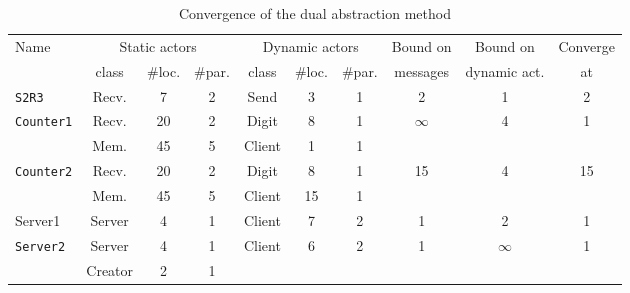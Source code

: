 \documentclass[a4paper]{report}
\numberwithin{algorithm}{chapter}
\begin{document}
\begin{table}
\caption{Convergence of the dual abstraction method}
\label{tblDual}
\centering
{\tiny
\begin{tabular}{l|ccc|ccc|cc|c}
Name & \multicolumn{3}{c}{Static actors}  & \multicolumn{3}{c}{Dynamic actors} & Bound on & Bound on & Converge \\
     & class & \#loc. & \#par. & class & \#loc. & \#par.  & messages & dynamic act. & at \\
\hline
\hline
\texttt{S2R3} & Recv. & 7      & 2      & Send  & 3      & 1       & 2        & 1            & 2 \\
\hline
\multirow{2}{*}{\texttt{Counter1}}
     & Recv. & 20  & 2         & Digit   & 8    & 1       & \multirow{2}{*}{$\infty$} & \multirow{2}{*}{4} & \multirow{2}{*}{1} \\
     & Mem.  & 45  & 5         & Client  & 1    & 1       &          &              & \\
\hline
\multirow{2}{*}{\texttt{Counter2}}
     & Recv. & 20  & 2         & Digit   & 8    & 1       & \multirow{2}{*}{15} & \multirow{2}{*}{4} & \multirow{2}{*}{15} \\
     & Mem.  & 45  & 5         & Client  & 15   & 1       &          &              & \\
\hline
Server1 & Server  & 4  & 1        & Client  & 7    & 2       & 1 & 2 & 1 \\
\hline
\multirow{2}{*}{\texttt{Server2}}
     & Server  & 4  & 1        & \multirow{2}{*}{Client} & \multirow{2}{*}{6} & \multirow{2}{*}{2} & \multirow{2}{*}{1} & \multirow{2}{*}{$\infty$} & \multirow{2}{*}{1} \\
     & Creator & 2  & 1        &    &     &         &          &              & \\
\hline
\end{tabular}
}
\end{table}
\end{document}
